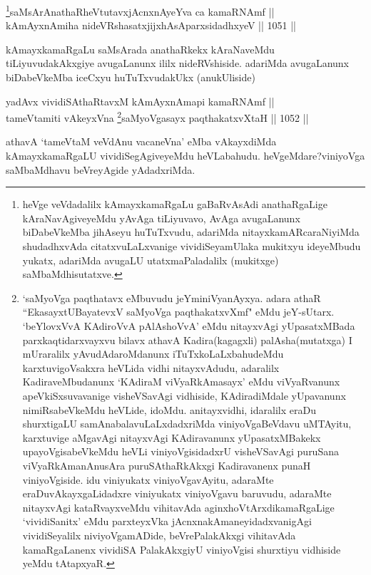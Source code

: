 \begin{shl}
\footnote{heVge veVdadalilx kAmayxkamaRgaLu gaBaRvAsAdi anathaRgaLige kAraNavAgiveyeMdu yAvAga tiLiyuvavo, AvAga avugaLanunx biDabeVkeMba jihAseyu huTuTxvudu, adariMda nitayxkamARcaraNiyiMda shudadhxvAda citatxvuLaLxvanige vividiSeyamUlaka mukitxyu ideyeMbudu yukatx, adariMda avugaLU utatxmaPaladalilx (mukitxge) saMbaMdhisutatxve.}saMsArAnathaRheVtutavxjAcnxnAyeYva ca kamaRNAmf || \\
kAmAyxnAmiha nideVRshasatxjijxhAsAparxsidadhxyeV \hfill || 1051 ||  
\end{shl}

\begin{artha}
kAmayxkamaRgaLu saMsArada anathaRkekx kAraNaveMdu tiLiyuvudakAkxgiye avugaLanunx ililx nideRVshiside. adariMda avugaLanunx biDabeVkeMba iceCxyu huTuTxvudakUkx (anukUliside)
\end{artha}


\begin{shl}
yadAvx vividiSAthaRtavxM kAmAyxnAmapi kamaRNAmf || \\
tameVtamiti vAkeyxVna \footnote{`saMyoVga paqthatavx eMbuvudu jeYminiVyanAyxya. adara athaR ``EkasayxtUBayatevxV saMyoVga paqthakatxvXmf" eMdu jeY-sUtarx. `beYlovxVvA KAdiroVvA pAlAshoVvA' eMdu nitayxvAgi yUpasatxMBada parxkaqtidarxvayxvu bilavx athavA Kadira(kagagxli) palAsha(mutatxga) I mUraralilx yAvudAdaroMdanunx iTuTxkoLaLxbahudeMdu karxtuvigoVsakxra heVLida vidhi nitayxvAdudu, adaralilx KadiraveMbudanunx `KAdiraM viVyaRkAmasayx' eMdu viVyaRvanunx apeVkiSxsuvavanige visheVSavAgi vidhiside, KAdiradiMdale yUpavanunx nimiRsabeVkeMdu heVLide, idoMdu. anitayxvidhi, idaralilx eraDu shurxtigaLU samAnabalavuLaLxdadxriMda viniyoVgaBeVdavu uMTAyitu, karxtuvige aMgavAgi nitayxvAgi KAdiravanunx yUpasatxMBakekx upayoVgisabeVkeMdu heVLi viniyoVgisidadxrU visheVSavAgi puruSana viVyaRkAmanAnusAra puruSAthaRkAkxgi Kadiravanenx punaH viniyoVgiside. idu viniyukatx viniyoVgavAyitu, adaraMte eraDuvAkayxgaLidadxre viniyukatx viniyoVgavu baruvudu, adaraMte nitayxvAgi kataRvayxveMdu vihitavAda aginxhoVtArxdikamaRgaLige `vividiSanitx' eMdu parxteyxVka jAcnxnakAmaneyidadxvanigAgi vividiSeyalilx niviyoVgamADide, beVrePalakAkxgi vihitavAda kamaRgaLanenx vividiSA PalakAkxgiyU viniyoVgisi shurxtiyu vidhiside yeMdu tAtapxyaR.}saMyoVgasayx paqthakatxvXtaH \hfill || 1052 ||  
\end{shl}


\begin{artha}
athavA `tameVtaM veVdAnu vacaneVna' eMba vAkayxdiMda kAmayxkamaRgaLU vividiSegAgiveyeMdu heVLabahudu. heVgeMdare?\break viniyoVga saMbaMdhavu beVreyAgide yAdadxriMda.
\end{artha}

